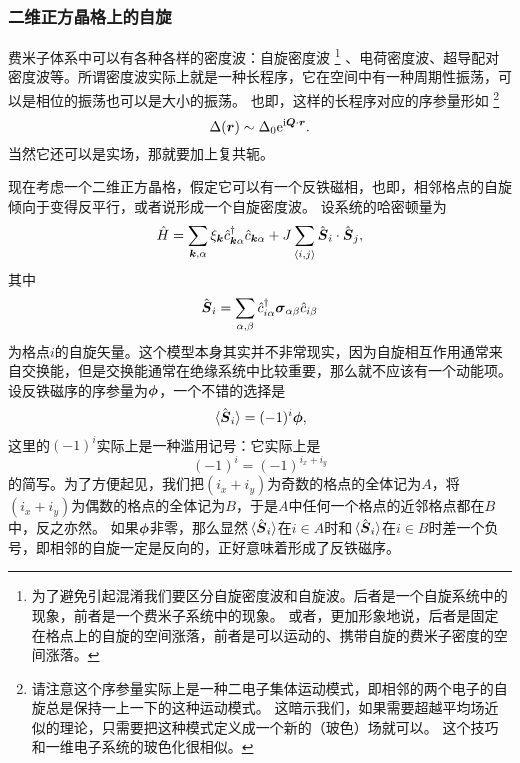 \documentclass[hyperref, UTF8, a4paper]{ctexart}
\newcommand*{\ii}{\mathrm{i}}
\newcommand*{\ee}{\mathrm{e}}
\newcommand*{\pair}[1]{\langle #1 \rangle}
\begin{document}
\subsubsection{二维正方晶格上的自旋}

费米子体系中可以有各种各样的密度波：自旋密度波%
\footnote{
    为了避免引起混淆我们要区分自旋密度波和自旋波。后者是一个自旋系统中的现象，前者是一个费米子系统中的现象。
    或者，更加形象地说，后者是固定在格点上的自旋的空间涨落，前者是可以运动的、携带自旋的费米子密度的空间涨落。
}%
、电荷密度波、超导配对密度波等。所谓密度波实际上就是一种长程序，它在空间中有一种周期性振荡，可以是相位的振荡也可以是大小的振荡。
也即，这样的长程序对应的序参量形如%
\footnote{请注意这个序参量实际上是一种二电子集体运动模式，即相邻的两个电子的自旋总是保持一上一下的这种运动模式。
这暗示我们，如果需要超越平均场近似的理论，只需要把这种模式定义成一个新的（玻色）场就可以。
这个技巧和一维电子系统的玻色化很相似。}%
\begin{equation}
    \Delta(\vb*{r}) \sim \Delta_0 \ee^{\ii \vb*{Q} \cdot \vb*{r}}.
\end{equation}
当然它还可以是实场，那就要加上复共轭。

现在考虑一个二维正方晶格，假定它可以有一个反铁磁相，也即，相邻格点的自旋倾向于变得反平行，或者说形成一个自旋密度波。
设系统的哈密顿量为
\begin{equation}
    \hat{H} = \sum_{\vb*{k}, \alpha} \xi_{\vb*{k}} \hat{c}_{\vb*{k} \alpha}^\dagger \hat{c}_{\vb*{k} \alpha} + J \sum_{\pair{i, j}} \hat{\vb*{S}}_i \cdot \hat{\vb*{S}}_j,
    \label{eq:2dim-square-spin}
\end{equation}
其中
\begin{equation}
    \hat{\vb*{S}}_i = \sum_{\alpha, \beta} \hat{c}^\dagger_{i \alpha} \vb*{\sigma}_{\alpha \beta} \hat{c}_{i \beta}
    \label{eq:spin-wave-order-parameter}
\end{equation}
为格点$i$的自旋矢量。这个模型本身其实并不非常现实，因为自旋相互作用通常来自交换能，但是交换能通常在绝缘系统中比较重要，那么就不应该有一个动能项。
设反铁磁序的序参量为$\vb*{\phi}$，一个不错的选择是
\begin{equation}
    \expval*{\hat{\vb*{S}}_i} = (-1)^i \vb*{\phi},
\end{equation}
这里的$(-1)^i$实际上是一种滥用记号：它实际上是
\[
    (-1)^i = (-1)^{i_x + i_y}
\]
的简写。为了方便起见，我们把$(i_x + i_y)$为奇数的格点的全体记为$A$，将$(i_x + i_y)$为偶数的格点的全体记为$B$，于是$A$中任何一个格点的近邻格点都在$B$中，反之亦然。
如果$\vb*{\phi}$非零，那么显然$\expval*{\hat{\vb*{S}}_i}$在$i \in A$时和$\expval*{\hat{\vb*{S}}_i}$在$i \in B$时差一个负号，即相邻的自旋一定是反向的，正好意味着形成了反铁磁序。
\end{document}

